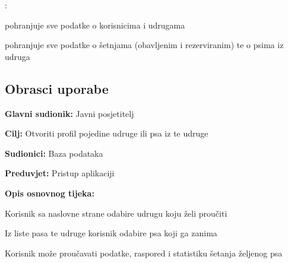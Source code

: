\begin{packed_enum}
			\item  {}:
			\begin{packed_enum}
				\item pohranjuje sve podatke o korisnicima i udrugama 
				\item pohranjuje sve podatke o šetnjama (obavljenim i rezerviranim) te o psima iz udruga 
			\end{packed_enum}
		
		\end{packed_enum}
		
		\eject 
		
		
			
		\subsection{Obrasci uporabe}
		\vspace{5mm}
			
		
			
			\noindent {}
			\begin{packed_item}
				
				\item \textbf{Glavni sudionik:} Javni posjetitelj
				\item  \textbf{Cilj:} Otvoriti profil pojedine udruge ili psa iz te udruge
				\item  \textbf{Sudionici:} Baza podataka
				\item  \textbf{Preduvjet:} Pristup aplikaciji
				\item  \textbf{Opis osnovnog tijeka:}
				
				\item[] \begin{packed_enum}
					
					\item Korisnik sa naslovne strane odabire udrugu koju želi proučiti
					\item Iz liste pasa te udruge korisnik odabire psa koji ga zanima
					\item Korisnik može proučavati podatke, raspored i statistiku šetanja željenog psa
				\end{packed_enum}
			\end{packed_item}
		
